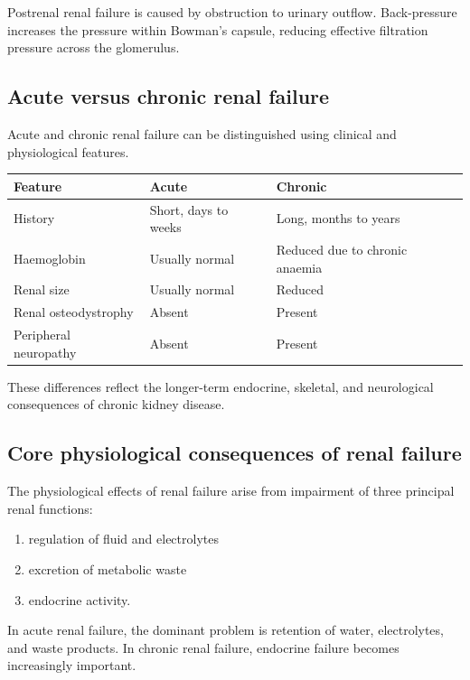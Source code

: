 \documentclass[11pt,a4paper]{article}
\begin{document}
Postrenal renal failure is caused by obstruction to urinary outflow. Back-pressure increases the pressure within Bowman’s capsule, reducing effective filtration pressure across the glomerulus.\cite{KamPowerRenalFailure}

\subsection{Acute versus chronic renal failure}

Acute and chronic renal failure can be distinguished using clinical and physiological features.

\begin{center}
\begin{tabular}{p{}p{}p{}}
\hline
\textbf{Feature} & \textbf{Acute} & \textbf{Chronic} \\
\hline
History & Short, days to weeks & Long, months to years \\
Haemoglobin & Usually normal & Reduced due to chronic anaemia \\
Renal size & Usually normal & Reduced \\
Renal osteodystrophy & Absent & Present \\
Peripheral neuropathy & Absent & Present \\
\hline
\end{tabular}
\end{center}

These differences reflect the longer-term endocrine, skeletal, and neurological consequences of chronic kidney disease.\cite{KamPowerRenalFailure}

\subsection{Core physiological consequences of renal failure}

The physiological effects of renal failure arise from impairment of three principal renal functions:
\begin{enumerate}
  \item regulation of fluid and electrolytes
  \item excretion of metabolic waste
  \item endocrine activity.
\end{enumerate}

In acute renal failure, the dominant problem is retention of water, electrolytes, and waste products. In chronic renal failure, endocrine failure becomes increasingly important.\cite{KamPowerRenalFailure}
\end{document}
